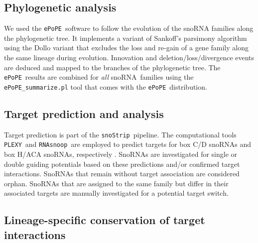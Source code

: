 \documentclass[preprint,3p,times,twocolumn]{elsarticle}
\newcommand{\sno}{snoRNA}
\newcommand{\cd}{box C/D snoRNA}
\newcommand{\haca}{box H/ACA snoRNA}
\newcommand{\snostrip}{\texttt{snoStrip}}
\newcommand{\epope}{\texttt{ePoPE}}
\newcommand{\plexy}{\texttt{PLEXY}}
\newcommand{\snoop}{\texttt{RNAsnoop}}
\begin{document}
\subsection{Phylogenetic analysis}

We used the \epope\ software \cite{Hertel:2015} to follow the
evolution of the snoRNA families along the phylogenetic tree. It
implements a variant of Sankoff's parsimony algorithm using the Dollo
variant that excludes the loss and re-gain of a gene family along the
same lineage during evolution.  Innovation and
deletion$/$loss$/$divergence events are deduced and mapped to the
branches of the phylogenetic tree.  The \epope\ results are combined
for \emph{all} \sno\ families using the \texttt{ePoPE\_summarize.pl}
tool that comes with the \epope\ distribution.

\subsection{Target prediction and analysis}

Target prediction is part of the \snostrip\ pipeline. The
computational tools \plexy\ and \snoop\ are employed to predict targets for
\cd s and \haca s, respectively \cite{Kehr:2011,Tafer:2010}.  SnoRNAs are
investigated for single or double guiding potentials based on these
predictions and/or confirmed target interactions. SnoRNAs that remain
without target association are considered orphan. SnoRNAs that are assigned
to the same family but differ in their associated targets are manually
investigated for a potential target switch.

\subsection{Lineage-specific conservation of target interactions}
\end{document}
